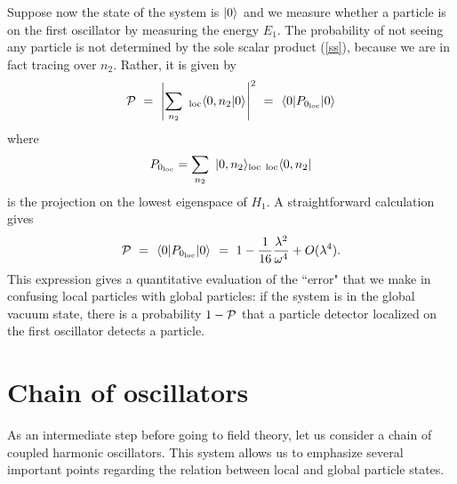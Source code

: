 \documentclass[10pt, nofootinbib]{revtex4}
\newcommand{\be}{\begin{equation}}
\newcommand{\ee}{\end{equation}}
\newcommand{\bea}{\begin{eqnarray}}
\newcommand{\eea}{\end{eqnarray}}
\begin{document}
Suppose now the state of the system is $|0\rangle_{\rm }$ and we
measure whether a particle is on the first oscillator by measuring the
energy $E_{1}$.  The probability of not seeing any particle is not
determined by the sole scalar product (\ref{ss}), because we are in
fact tracing over $n_{2}$.  Rather, it is given by
%
\be 
{\cal P} \ =\  \left| \sum_{n_{2}}\ {}_{\rm loc}\langle 0, n_{2}
|0\rangle_{\rm } \right|^2 
\ =\ 
{}_{\rm }\langle 0|P_{0_{\rm loc}}|0\rangle_{\rm }
\ee
%
where 
%
\bea 
P_{0_{\rm loc}}=\sum_{n_2}\ |0,n_{2}\rangle_{\rm loc}\ {}_{\rm loc}\langle
0,n_{2}|
\eea
%
is the projection on the lowest eigenspace of $H_{1}$.
A straightforward calculation gives 
%
\be
{\cal P} \ =\ 
{}_{\rm }\langle 0|P_{0_{\rm loc}}|0\rangle_{\rm }
\ =\  1 
-\frac{1}{16}\frac{\lambda^2}{\omega^4} +
O(\lambda^4). 
\label{0p}
\ee
%
This expression gives a quantitative evaluation of the ``error" that
we make in confusing local particles with global particles: if the
system is in the global vacuum state, there is a probability $1-{\cal
P}$ that a particle detector localized on the first oscillator 
detects a particle. 


\section{Chain of oscillators}

As an intermediate step before going to field theory, let us consider
a chain of coupled harmonic oscillators.  This system allows us to
emphasize several important points regarding the relation between
local and global particle states.
\end{document}
